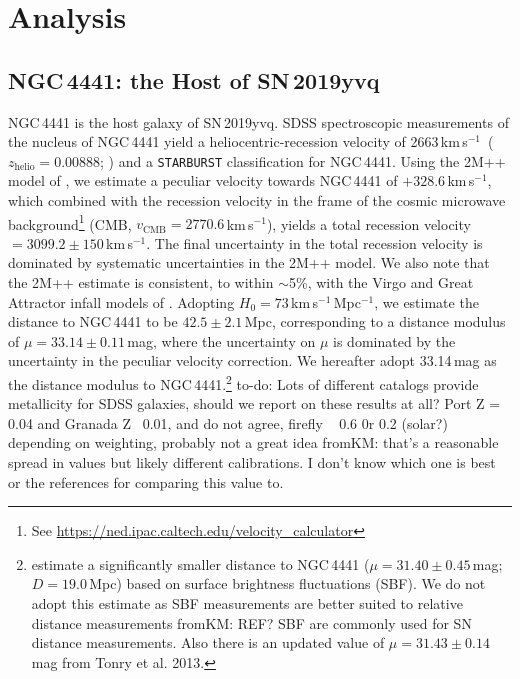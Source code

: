 \documentclass[twocolumn]{aastex63}
\newcommand{\fromkate}[1]{{\color{brown} fromKM: {#1}}}
\newcommand{\todo}[1]{{\color{magenta} to-do: {#1}}}
\newcommand{\kms}{km\,s$^{-1}$}
\newcommand{\sn}{SN\,2019yvq}
\begin{document}
\section{Analysis}\label{sec:analysis}

\subsection{NGC\,4441: the Host of \sn}\label{sec:host}

NGC\,4441 is the host galaxy of \sn. SDSS spectroscopic measurements of the
nucleus of NGC\,4441 yield a heliocentric-recession velocity of 2663\,\kms\
($z_\mathrm{helio} = 0.00888$; \citealt{Abolfathi18}) and a
\texttt{STARBURST} classification for NGC\,4441. Using the 2M++ model of
\citet{Carrick15}, we estimate a peculiar velocity towards NGC\,4441 of
$+328.6$\,\kms, which combined with the recession velocity in the frame of
the cosmic microwave background\footnote{See
\url{https://ned.ipac.caltech.edu/velocity_calculator}} (CMB,
$v_\mathrm{CMB} = 2770.6$\,\kms), yields a total recession velocity $=
3099.2 \pm 150$\,\kms. The final uncertainty in the total recession velocity
is dominated by systematic uncertainties in the 2M++ model. We also note
that the 2M++ estimate is consistent, to within $\sim$5\%, with the Virgo
and Great Attractor infall models of \citet{Mould00}. Adopting $H_0 =
73$\,\kms\,Mpc$^{-1}$, we estimate the distance to NGC\,4441 to be $42.5 \pm
2.1$\,Mpc, corresponding to a distance modulus of $\mu = 33.14 \pm
0.11$\,mag, where the uncertainty on $\mu$ is dominated by the uncertainty
in the peculiar velocity correction. We hereafter adopt 33.14\,mag as the
distance modulus to NGC\,4441.\footnote{\citet{Tonry01} estimate a
significantly smaller distance to NGC\,4441 ($\mu = 31.40 \pm 0.45$\,mag; $D
= 19.0$\,Mpc) based on surface brightness fluctuations (SBF). We do not
adopt this estimate as SBF measurements are better suited to relative
distance measurements \fromkate{REF? SBF are commonly used for SN distance
measurements. Also there is an updated value of $\mu = 31.43 \pm 0.14$\,mag
from Tonry et al. 2013}.} \todo{Lots of different catalogs provide
metallicity for SDSS galaxies, should we report on these results at all?
Port Z = 0.04 and Granada Z ~0.01, and do not agree, firefly ~ 0.6 0r 0.2
(solar?) depending on weighting, probably not a great idea} \fromkate{that's
a reasonable spread in values but likely different calibrations. I don't
know which one is best or the references for comparing this value to. }
\end{document}
